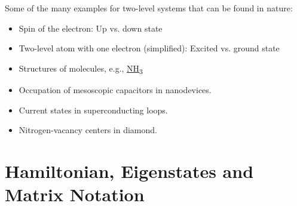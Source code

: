 \documentclass[10pt]{article}
\begin{document}
Some of the many examples for two-level systems that can be found in nature:
\begin{itemize}
\item Spin of the electron: Up vs. down state
\item Two-level atom with one electron (simplified): Excited vs. ground state
\item Structures of molecules, e.g., \hyperref[fig:twostate]{NH\textsubscript{3}}
\item Occupation of mesoscopic capacitors in nanodevices.
\item Current states in superconducting loops.
\item Nitrogen-vacancy centers in diamond.
\end{itemize}

\section{Hamiltonian, Eigenstates and Matrix Notation}
\end{document}
